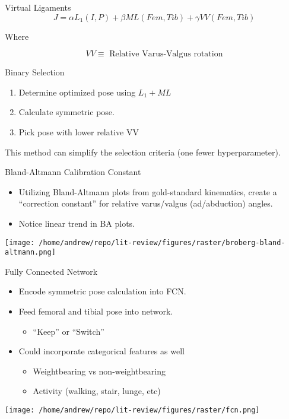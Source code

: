 \documentclass[presentation, aspectratio=1610]{beamer}
\begin{document}
\begin{frame}[label={sec:orgbebd5ff}]{Virtual Ligaments}
\begin{equation*}
  J = \alpha L_{1}(I,P) + \beta ML(Fem,Tib) + \gamma VV(Fem,Tib)
\end{equation*}

Where

\begin{equation*}
  VV \equiv \text{  Relative Varus-Valgus rotation}
\end{equation*}
\end{frame}

\begin{frame}[label={sec:orged00c5c}]{Binary Selection}
\begin{enumerate}
\item Determine optimized pose using \(L_1 + ML\)
\item Calculate symmetric pose.
\item Pick pose with lower relative VV
\end{enumerate}

This method can simplify the selection criteria (one fewer hyperparameter).
\end{frame}
\begin{frame}[label={sec:orgf559ce2}]{Bland-Altmann Calibration Constant}
\begin{itemize}
\item Utilizing Bland-Altmann plots from gold-standard kinematics, create a ``correction constant'' for relative varus/valgus (ad/abduction) angles.
\item Notice linear trend in BA plots.
\end{itemize}
\begin{center}
\texttt{[image: /home/andrew/repo/lit-review/figures/raster/broberg-bland-altmann.png]}
\end{center}
\end{frame}

\begin{frame}[label={sec:orgeb4908c}]{Fully Connected Network}
\begin{itemize}
\item Encode symmetric pose calculation into FCN.
\item Feed femoral and tibial \alert{\alert{pose}} into network.
\begin{itemize}
\item ``Keep'' or ``Switch''
\end{itemize}
\item Could incorporate categorical features as well
\begin{itemize}
\item Weightbearing vs non-weightbearing
\item Activity (walking, stair, lunge, etc)
\end{itemize}
\end{itemize}
\begin{center}
\texttt{[image: /home/andrew/repo/lit-review/figures/raster/fcn.png]}
\end{center}
\end{frame}
\end{document}
